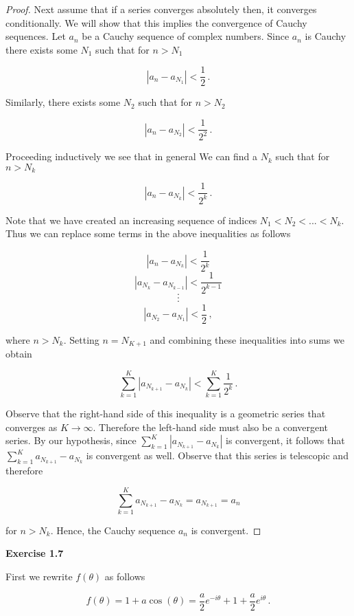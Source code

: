 \documentclass[a4paper]{article}
\newcommand {\m} {\cdot}
\numberwithin{equation}{section}
\begin{document}
\begin{description}
\begin{proof}
Next assume that if a series converges absolutely then, it converges conditionally. We will show that this implies the convergence of Cauchy sequences. Let ${a_n}$ be a Cauchy sequence of complex numbers. Since ${a_n}$ is Cauchy there exists some $N_1$ such that for $n > N_1$

$$|a_n - a_{N_1}| < \frac{1}{2}\,.$$

Similarly, there exists some $N_2$ such that for $n > N_2$

$$|a_n - a_{N_2}| < \frac{1}{2^2}\,.$$

Proceeding inductively we see that in general We can find a $N_k$ such that for $n > N_k$

$$|a_n - a_{N_k}| < \frac{1}{2^k}\,.$$

Note that we have created an increasing sequence of indices $N_1 < N_2 < ... < N_k$. Thus we can replace some terms in the above inequalities as follows

	$$|a_n - a_{N_k}| < \frac{1}{2^k}$$
	$$|a_{N_k} - a_{N_{k-1}}| < \frac{1}{2^{k-1}}$$
	$$\m$$
	$$\m$$
	$$\m$$
	$$|a_{N_2} - a_{N_{1}}| < \frac{1}{2}\,,$$
	
	where $n > N_k$. Setting $n = N_{K+1}$ and  combining these inequalities into sums we obtain
	
	$$\sum_{k=1}^K |a_{N_{k+1}} - a_{N_{k}}| < \sum_{k=1}^K \frac{1}{2^k}\,.$$
	
	Observe that the right-hand side of this inequality is a geometric series that converges as $K \rightarrow \infty$. Therefore the left-hand side must also be a convergent series. By our hypothesis, since $\sum_{k=1}^K |a_{N_{k+1}} - a_{N_{k}}|$ is convergent, it follows that $\sum_{k=1}^K a_{N_{k+1}} - a_{N_{k}}$ is convergent as well.  Observe that this series is telescopic and therefore
	
	$$\sum_{k=1}^K a_{N_{k+1}} - a_{N_{k}} = a_{N_{k+1}} = a_n$$
	
	for $n > N_{k}$. Hence, the Cauchy sequence ${a_n}$ is convergent.

\end{proof}

\item \textbf{Exercise 1.7}

\begin{description}
	\item First we rewrite $f(\theta)$ as follows
	
	$$f(\theta) = 1+a\cos(\theta) = \frac{a}{2}e^{-i\theta} + 1 + \frac{a}{2}e^{i\theta}\,.$$
	

\end{description}
\end{description}
\end{document}
